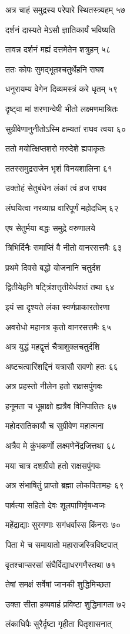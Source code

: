 अत्र चाहं समुद्रस्य परेपारे स्थितस्त्र्यहम् ५७

दर्शनं दास्यते मेऽसौ ज्ञातिकार्यं भविष्यति

तावन्न दर्शनं मह्यं दत्तमेतेन शत्रुहन् ५८

ततः कोपः सुमद्भूतश्चतुर्थेहनि राघव

धनुरायम्य वेगेन दिव्यमस्त्रं करे धृतम् ५९

दृष्ट्वा मां शरणान्वेषी भीतो लक्ष्मणमाश्रितः

सुग्रीवेणानुनीतोऽस्मि क्षम्यतां राघव त्वया ६०

ततो मयोत्क्षिप्तशरो मरुदेशे ह्यपाकृतः

ततस्समुद्रराजेन भृशं विनयशालिना ६१

उक्तोहं सेतुबंधेन लंकां त्वं व्रज राघव

लंघयित्वा नरव्याघ्र वारिपूर्णं महोदधिम् ६२

एष सेतुर्मया बद्धः समुद्रे वरुणालये

त्रिभिर्दिनैः समाप्तिं वै नीतो वानरसत्तमैः ६३

प्रथमे दिवसे बद्धो योजनानि चतुर्दश

द्वितीयेहनि षट्त्रिंशत्तृतीयेर्धशतं तथा ६४

इयं सा दृश्यते लंका स्वर्णप्राकारतोरणा

अवरोधो महानत्र कृतो वानरसत्तमैः ६५

अत्र युद्धं महद्वृत्तं चैत्राशुक्लचतुर्दशि

अष्टचत्वारिंशद्दिनं यत्रासौ रावणो हतः ६६

अत्र प्रहस्तो नीलेन हतो राक्षसपुंगवः

हनूमता च धूम्राक्षो ह्यत्रैव विनिपातितः ६७

महोदरातिकायौ च सुग्रीवेण महात्मना

अत्रैव मे कुंभकर्णो लक्ष्मणेनेंद्रजित्तथा ६८

मया चात्र दशग्रीवो हतो राक्षसपुंगवः

अत्र संभाषितुं प्राप्तो ब्रह्मा लोकपितामहः ६९

पार्वत्या सहितो देवः शूलपाणिर्वृषध्वजः

महेंद्राद्याः सुरगणाः सगंधर्वास्स किंनराः ७०

पिता मे च समायातो महाराजस्त्रिविष्टपात्

वृतश्चाप्सरसां संघैर्विद्याधरगणैस्तथा ७१

तेषां समक्षं सर्वेषां जानकी शुद्धिमिच्छता

उक्ता सीता हव्यवाहं प्रविष्टा शुद्धिमागता ७२

लंकाधिपैः सुरैर्दृष्टा गृहीता पितृशासनात्


